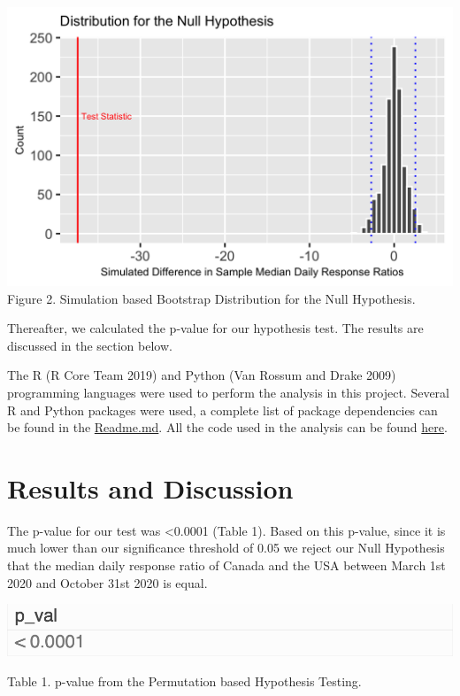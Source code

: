 \documentclass[
]{article}
\begin{document}
\includegraphics{../results/median_simulation.png} Figure 2. Simulation
based Bootstrap Distribution for the Null Hypothesis.

Thereafter, we calculated the p-value for our hypothesis test. The
results are discussed in the section below.

The R (R Core Team 2019) and Python (Van Rossum and Drake 2009)
programming languages were used to perform the analysis in this project.
Several R and Python packages were used, a complete list of package
dependencies can be found in the
\href{https://github.com/UBC-MDS/covid-19-cases-vs-tests-analysis/blob/main/README.md}{Readme.md}.
All the code used in the analysis can be found
\href{https://github.com/UBC-MDS/covid-19-cases-vs-tests-analysis/tree/main/src}{here}.

\hypertarget{results-and-discussion}{%
\section{Results and Discussion}\label{results-and-discussion}}

The p-value for our test was \textless0.0001 (Table 1). Based on this
p-value, since it is much lower than our significance threshold of 0.05
we reject our Null Hypothesis that the median daily response ratio of
Canada and the USA between March 1st 2020 and October 31st 2020 is
equal.

\includegraphics{../results/simulation_pval.png}

Table 1. p-value from the Permutation based Hypothesis Testing.
\end{document}
